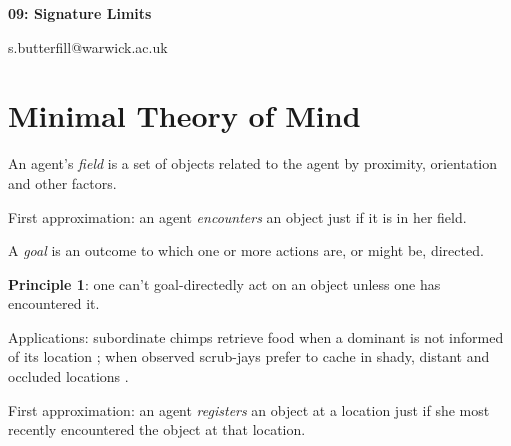 \documentclass[12pt]{extarticle}
\date{}
\makeatletter
\def \ititle {Philosophical Psychology}
\def \iemail{s.butterfill@warwick.ac.uk}
\makeatother
\begin{document}
\begin{multicols*}{3}

\setlength\footnotesep{1em}









\def \ititle {09: Signature Limits}

\begin{center}

{\Large

\textbf{\ititle}

}



\iemail %

\end{center}



\section{Minimal Theory of Mind}

An agent’s \emph{field} is a set of objects related to the agent by proximity, orientation and other factors.

First approximation: an agent \emph{encounters} an object just if it is in her field.

A \emph{goal} is an outcome to which one or more actions are, or might be, directed.


\textbf{Principle 1}: one can’t goal-directedly act on an object unless one has encountered it.

Applications: subordinate chimps retrieve food when a dominant is not informed of its
          location \citep{Hare:2001ph}; when observed scrub-jays prefer to cache in shady, distant and
          occluded locations \citep{Dally:2004xf,Clayton:2007fh}.

First approximation: an agent \emph{registers} an object at a location just if she most recently encountered the object at that location.


\end{multicols*}
\end{document}
